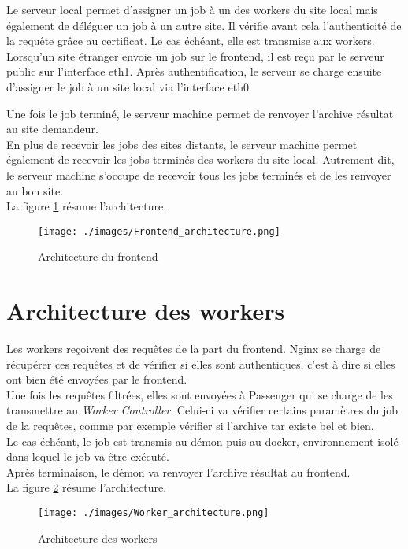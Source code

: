 Le serveur local permet d'assigner un job à un des workers du site local mais également de déléguer un job à un autre site. Il vérifie avant cela l'authenticité de la requête grâce au certificat. Le cas échéant, elle est transmise aux workers. \\

Lorsqu'un site étranger envoie un job sur le frontend, il est reçu par le serveur public sur l'interface eth1. Après authentification, le serveur se charge ensuite d'assigner le job à un site local via l'interface eth0.

Une fois le job terminé, le serveur machine permet de renvoyer l'archive résultat au site demandeur. \\

En plus de recevoir les jobs des sites distants, le serveur machine permet également de recevoir les jobs terminés des workers du site local. Autrement dit, le serveur machine s'occupe de recevoir tous les jobs terminés et de les renvoyer au bon site. \\

La figure \ref{front_arch} résume l'architecture.

\begin{figure}[!hbtp]
    \centering
    \texttt{[image: ./images/Frontend\_architecture.png]}
    \label{front_arch}
    \caption{Architecture du frontend}
\end{figure}

\section{Architecture des workers}

Les workers reçoivent des requêtes de la part du frontend. Nginx se charge de récupérer ces requêtes et de vérifier si elles sont authentiques, c'est à dire si elles ont bien été envoyées par le frontend. \\

Une fois les requêtes filtrées, elles sont envoyées à Passenger qui se charge de les transmettre au {\it Worker Controller}. Celui-ci va vérifier certains paramètres du job de la requêtes, comme par exemple vérifier si l'archive tar existe bel et bien.  \\

Le cas échéant, le job est transmis au démon puis au docker, environnement isolé dans lequel le job va être exécuté. \\

Après terminaison, le démon va renvoyer l'archive résultat au frontend. \\

La figure \ref{work_arch} résume l'architecture.

\begin{figure}[!hbtp]
    \centering
    \texttt{[image: ./images/Worker\_architecture.png]}
    \label{work_arch}
    \caption{Architecture des workers}
\end{figure}
